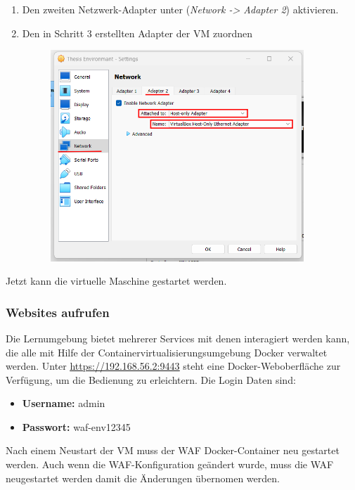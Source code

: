 \begin{enumerate}
\begin{figure}[!hbt]
    \end{figure}
    \item Den zweiten Netzwerk-Adapter unter (\textit{Network -> Adapter 2}) aktivieren.
    \item Den in Schritt 3 erstellten Adapter der VM zuordnen
    \begin{figure}[!hbt]
        \centering
        \includegraphics[width=0.9\textwidth]{./images/vm-ho-config.png}
    \end{figure}
\end{enumerate}
\pagebreak

Jetzt kann die virtuelle Maschine gestartet werden.

\subsubsection{Websites aufrufen}
Die Lernumgebung bietet mehrerer Services mit denen interagiert werden kann, die alle mit Hilfe der Containervirtualisierungsumgebung Docker verwaltet werden.
Unter \href{https://192.168.56.2:9443}{\underline{https://192.168.56.2:9443}} steht eine Docker-Weboberfläche zur Verfügung, um die Bedienung zu erleichtern.
Die Login Daten sind:
\begin{itemize}
    \item \textbf{Username:} admin
    \item \textbf{Passwort:} waf-env12345
\end{itemize}

Nach einem Neustart der VM muss der WAF Docker-Container neu gestartet werden.
Auch wenn die WAF-Konfiguration geändert wurde, muss die WAF neugestartet werden damit die Änderungen übernomen werden.


